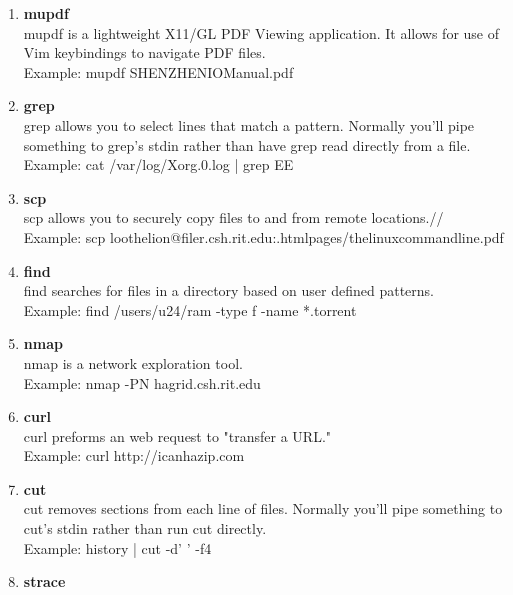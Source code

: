 \documentclass[9pt]{extarticle} %
\begin{document}
%
%
\begin{minipage}[t]{.61\linewidth} %
\vspace{-0.4cm}
\hypertarget{firstnews}{}
 
 \begin{enumerate}[leftmargin=0.2cm]
 	\item \textbf{mupdf} \\
 	mupdf is a lightweight X11/GL PDF Viewing application. It allows for use of Vim keybindings to navigate PDF files. \\
 	Example: mupdf SHENZHEN\textunderscore IO\textunderscore Manual.pdf 
	\item \textbf{grep} \\
 	grep allows you to select lines that match a pattern. Normally you'll pipe something to grep's stdin rather than have grep read directly from a file. \\ 
 	Example: cat /var/log/Xorg.0.log | grep EE
 	\item \textbf{scp}\\
 	scp allows you to securely copy files to and from remote locations.//
 	Example: scp loothelion@filer.csh.rit.edu:.html\textunderscore pages/thelinuxcommandline.pdf
 	\item \textbf{find}\\
 	find searches for files in a directory based on user defined patterns. \\
 	Example: find /users/u24/ram -type f -name *.torrent
 	\item \textbf{nmap}\\
 	nmap is a network exploration tool. \\
 	Example: nmap -PN hagrid.csh.rit.edu
 	\item \textbf{curl} \\
 	curl preforms an web request to "transfer a URL." \\
 	Example: curl http://icanhazip.com 
 	\item \textbf{cut}\\
 	cut removes sections from each line of files. Normally you'll pipe something to cut's stdin rather than run cut directly. \\
 	Example: history | cut -d' ' -f4 
 	\item \textbf{strace}\\

\end{enumerate}
\end{minipage}
\end{document}
